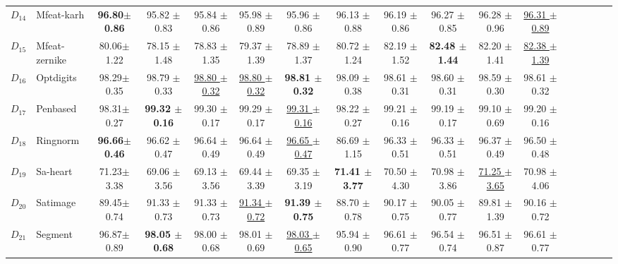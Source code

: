 {\begin{landscape}
\begin{table}[!ht]
\begin{adjustbox}{max width=1.5\textwidth}
\begin{tabular}{llccccccccccccccc}
  $D_{14}$ & Mfeat-karh &  \textbf{96.80$\pm$ 0.86} & 95.82 $\pm$ 0.83	  & 95.84 $\pm$ 0.86 & 95.98 $\pm$ 0.89  & 95.96 $\pm$ 0.86 & 96.13 $\pm$ 0.88 & 96.19 $\pm$ 0.86 & 96.27 $\pm$ 0.85 &96.28 $\pm$ 0.96 &\underline{96.31 $\pm$ 0.89} \\ 
  
  $D_{15}$ & Mfeat-zernike &  80.06$\pm$ 1.22  & 78.15 $\pm$ 1.48  & 78.83 $\pm$ 1.35 & 79.37 $\pm$ 1.39  & 78.89 $\pm$ 1.37  &  80.72 $\pm$ 1.24 & 82.19 $\pm$ 1.52 & \textbf{82.48 $\pm$ 1.44} &82.20 $\pm$ 1.41 &\underline{ 82.38 $\pm$ 1.39} \\ 
  
  $D_{16}$ & Optdigits &  98.29$\pm$ 0.35 & 98.79 $\pm$ 0.33 & \underline{98.80 $\pm$ 0.32}  & \underline{98.80 $\pm$ 0.32}  & \textbf{98.81 $\pm$ 0.32}  &  98.09 $\pm$ 0.38 & 98.61 $\pm$ 0.31 & 98.60 $\pm$ 0.31 &98.59 $\pm$ 0.30 & 98.61 $\pm$ 0.32 \\ 
  
  $D_{17}$ & Penbased &  98.31$\pm$ 0.27 & \textbf{99.32 $\pm$ 0.16}	 & 99.30 $\pm$ 0.17 & 99.29 $\pm$  0.17 & \underline{99.31 $\pm$ 0.16}  &  98.22 $\pm$ 0.27 & 99.21 $\pm$ 0.16 & 99.19 $\pm$ 0.17 &99.10 $\pm$ 0.69 &  99.20 $\pm$ 0.16  \\ 
  
  $D_{18}$ & Ringnorm &  \textbf{96.66$\pm$ 0.46}  & 96.62 $\pm$ 0.47 & 96.64 $\pm$ 0.49 & 96.64 $\pm$ 0.49  & \underline{96.65 $\pm$ 0.47}  &  86.69 $\pm$ 1.15 & 96.33 $\pm$ 0.51 & 96.33 $\pm$ 0.51 & 96.37 $\pm$ 0.49 &  96.50 $\pm$ 0.48 \\ 
  
  $D_{19}$ & Sa-heart &  71.23$\pm$ 3.38 & 69.06 $\pm$ 3.56	 & 69.13 $\pm$ 3.56 & 69.44 $\pm$ 3.39  & 69.35 $\pm$ 3.19
 & \textbf{71.41 $\pm$ 3.77} & 70.50 $\pm$ 4.30 & 70.98 $\pm$ 3.86 & \underline{71.25 $\pm$ 3.65} & 70.98 $\pm$ 4.06 \\ 
  
  $D_{20}$ & Satimage &  89.45$\pm$ 0.74  & 91.33 $\pm$ 0.73  & 91.33 $\pm$ 0.73 & \underline{91.34 $\pm$ 0.72}   & \textbf{91.39 $\pm$ 0.75}
 & 88.70 $\pm$ 0.78 & 90.17 $\pm$ 0.75 & 90.05 $\pm$ 0.77 & 89.81 $\pm$ 1.39 &  90.16 $\pm$ 0.72  \\
 
  $D_{21}$ & Segment &  96.87$\pm$ 0.89	 & \textbf{98.05 $\pm$ 0.68}  & 98.00 $\pm$ 0.68 & 98.01 $\pm$ 0.69 & \underline{98.03 $\pm$ 0.65}  &  95.94 $\pm$ 0.90 & 96.61 $\pm$ 0.77 & 96.54 $\pm$ 0.74 & 96.51 $\pm$ 0.87 & 96.61 $\pm$ 0.77  \\ 
  

\end{tabular}
\end{adjustbox}
\end{table}
\end{landscape}}
